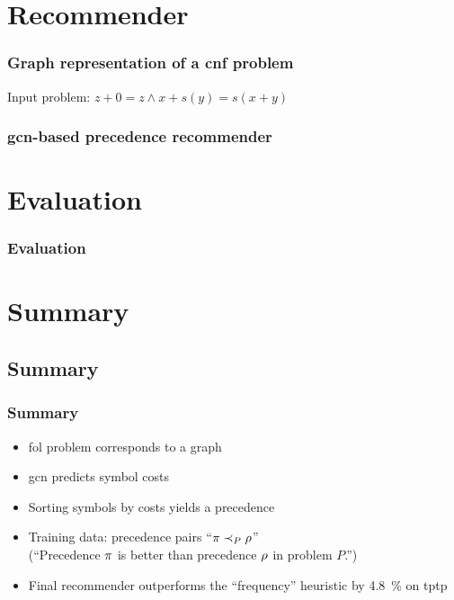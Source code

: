 \documentclass[a4paper]{beamer}
\begin{document}
\section{Recommender}

\begin{frame}
\frametitle{Graph representation of a \acrshort{cnf} problem}

Input problem: $z + 0 = z \land x + s(y) = s(x + y)$

\centering

\end{frame}

\begin{frame}
\frametitle{\Acrshort{gcn}-based precedence recommender}
\centering

\end{frame}

\section{Evaluation}

\begin{frame}
\frametitle{Evaluation}

\fontsize{10pt}{12}\selectfont

\centering


\end{frame}

\section{Summary}
\subsection*{Summary}
\begin{frame}
\frametitle{Summary}
\begin{itemize}
\item \Acrfull{fol} problem corresponds to a graph
\item \Acrfull{gcn} predicts symbol costs
\item Sorting symbols by costs yields a precedence
\item Training data: precedence pairs ``$\pi \prec_{P} \rho$'' \\
(``Precedence $\pi$ is better than precedence $\rho$ in problem $P$.'')
\item Final recommender outperforms the ``frequency'' heuristic by \SI{4.8}{\percent} on \acrshort{tptp}
\end{itemize}
\end{frame}
\end{document}
